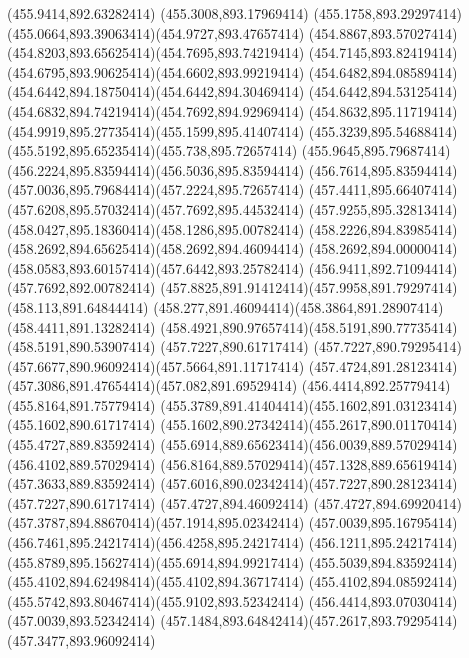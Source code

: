 {{	\lineto(455.9414,892.63282414)
	\lineto(455.3008,893.17969414)
	\curveto(455.1758,893.29297414)(455.0664,893.39063414)(454.9727,893.47657414)
	\curveto(454.8867,893.57027414)(454.8203,893.65625414)(454.7695,893.74219414)
	\curveto(454.7145,893.82419414)(454.6795,893.90625414)(454.6602,893.99219414)
	\curveto(454.6482,894.08589414)(454.6442,894.18750414)(454.6442,894.30469414)
	\curveto(454.6442,894.53125414)(454.6832,894.74219414)(454.7692,894.92969414)
	\curveto(454.8632,895.11719414)(454.9919,895.27735414)(455.1599,895.41407414)
	\curveto(455.3239,895.54688414)(455.5192,895.65235414)(455.738,895.72657414)
	\curveto(455.9645,895.79687414)(456.2224,895.83594414)(456.5036,895.83594414)
	\curveto(456.7614,895.83594414)(457.0036,895.79684414)(457.2224,895.72657414)
	\curveto(457.4411,895.66407414)(457.6208,895.57032414)(457.7692,895.44532414)
	\curveto(457.9255,895.32813414)(458.0427,895.18360414)(458.1286,895.00782414)
	\curveto(458.2226,894.83985414)(458.2692,894.65625414)(458.2692,894.46094414)
	\curveto(458.2692,894.00000414)(458.0583,893.60157414)(457.6442,893.25782414)
	\lineto(456.9411,892.71094414)
	\lineto(457.7692,892.00782414)
	\curveto(457.8825,891.91412414)(457.9958,891.79297414)(458.113,891.64844414)
	\curveto(458.277,891.46094414)(458.3864,891.28907414)(458.4411,891.13282414)
	\curveto(458.4921,890.97657414)(458.5191,890.77735414)(458.5191,890.53907414)
	\closepath
	\moveto(457.7227,890.61717414)
	\curveto(457.7227,890.79295414)(457.6677,890.96092414)(457.5664,891.11717414)
	\curveto(457.4724,891.28123414)(457.3086,891.47654414)(457.082,891.69529414)
	\lineto(456.4414,892.25779414)
	\lineto(455.8164,891.75779414)
	\curveto(455.3789,891.41404414)(455.1602,891.03123414)(455.1602,890.61717414)
	\curveto(455.1602,890.27342414)(455.2617,890.01170414)(455.4727,889.83592414)
	\curveto(455.6914,889.65623414)(456.0039,889.57029414)(456.4102,889.57029414)
	\curveto(456.8164,889.57029414)(457.1328,889.65619414)(457.3633,889.83592414)
	\curveto(457.6016,890.02342414)(457.7227,890.28123414)(457.7227,890.61717414)
	\closepath
	\moveto(457.4727,894.46092414)
	\curveto(457.4727,894.69920414)(457.3787,894.88670414)(457.1914,895.02342414)
	\curveto(457.0039,895.16795414)(456.7461,895.24217414)(456.4258,895.24217414)
	\curveto(456.1211,895.24217414)(455.8789,895.15627414)(455.6914,894.99217414)
	\curveto(455.5039,894.83592414)(455.4102,894.62498414)(455.4102,894.36717414)
	\curveto(455.4102,894.08592414)(455.5742,893.80467414)(455.9102,893.52342414)
	\lineto(456.4414,893.07030414)
	\lineto(457.0039,893.52342414)
	\curveto(457.1484,893.64842414)(457.2617,893.79295414)(457.3477,893.96092414)
}}

